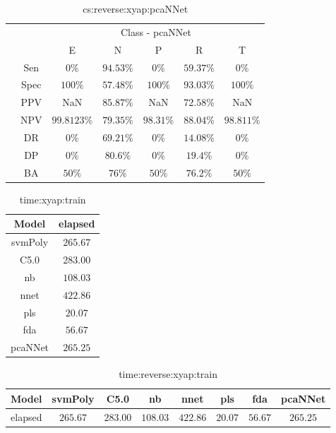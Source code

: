 \begin{table}[!ht]
	\centering
	\begin{tabular}{|c|c|c|c|c|c|c|}
		\cline{3-7}
		\multicolumn{2}{c|}{} & \multicolumn{5}{c|}{Class - pcaNNet} \\ \cline{3-7}
		\multicolumn{2}{c|}{} & E & N & P & R & T \\ \hline
		\multirow{7}{*}{\rotatebox{90}{Statistics}} & Sen & $0\%$ & $94.53\%$ & $0\%$ & $59.37\%$ & $0\%$ \\ \cline{2-7}
		 & Spec & $100\%$ & $57.48\%$ & $100\%$ & $93.03\%$ & $100\%$ \\ \cline{2-7}
		 & PPV & NaN & $85.87\%$ & NaN & $72.58\%$ & NaN \\ \cline{2-7}
		 & NPV & $99.8123\%$ & $79.35\%$ & $98.31\%$ & $88.04\%$ & $98.811\%$ \\ \cline{2-7}
		 & DR & $0\%$ & $69.21\%$ & $0\%$ & $14.08\%$ & $0\%$ \\ \cline{2-7}
		 & DP & $0\%$ & $80.6\%$ & $0\%$ & $19.4\%$ & $0\%$ \\ \cline{2-7}
		 & BA & $50\%$ & $76\%$ & $50\%$ & $76.2\%$ & $50\%$ \\ \hline
	\end{tabular}
	\caption{cs:reverse:xyap:pcaNNet}
	\label{tab:cs:reverse:xyap:pcaNNet}
\end{table}

\begin{table}[!ht]
	\centering
	\begin{tabular}{|c|c|}
		\hline
		Model & elapsed \\ \hline
		svmPoly & $265.67$ \\ \hline
		C5.0 & $283.00$ \\ \hline
		nb & $108.03$ \\ \hline
		nnet & $422.86$ \\ \hline
		pls & $20.07$ \\ \hline
		fda & $56.67$ \\ \hline
		pcaNNet & $265.25$ \\ \hline
	\end{tabular}
	\caption{time:xyap:train}
	\label{tab:time:xyap:train}
\end{table}

\begin{table}[!ht]
	\centering
	\begin{tabular}{|c|c|c|c|c|c|c|c|}
		\hline
		Model & svmPoly & C5.0 & nb & nnet & pls & fda & pcaNNet \\ \hline
		elapsed & $265.67$ & $283.00$ & $108.03$ & $422.86$ & $20.07$ & $56.67$ & $265.25$ \\ \hline
	\end{tabular}
	\caption{time:reverse:xyap:train}
	\label{tab:time:reverse:xyap:train}
\end{table}

